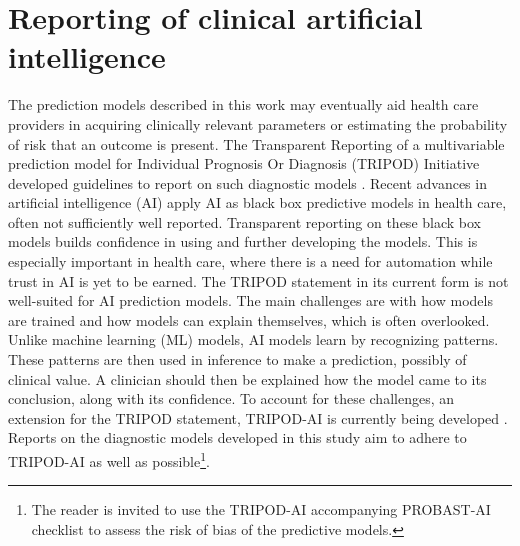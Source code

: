 \section{Reporting of clinical artificial intelligence}
The prediction models described in this work may eventually aid health care providers in acquiring clinically relevant parameters or estimating the probability of risk that an outcome is present.
The Transparent Reporting of a multivariable prediction model for Individual Prognosis Or Diagnosis (TRIPOD) Initiative developed guidelines to report on such diagnostic models \cite{Collins2015, Moons2015, Heus2020}.
Recent advances in artificial intelligence (AI) apply AI as black box predictive models in health care, often not sufficiently well reported.
Transparent reporting on these black box models builds confidence in using and further developing the models.
This is especially important in health care, where there is a need for automation while trust in AI is yet to be earned.
The TRIPOD statement in its current form is not well-suited for AI prediction models.
The main challenges are with how models are trained and how models can explain themselves, which is often overlooked.
Unlike machine learning (ML) models, AI models learn by recognizing patterns.
These patterns are then used in inference to make a prediction, possibly of clinical value.
A clinician should then be explained how the model came to its conclusion, along with its confidence.
To account for these challenges, an extension for the TRIPOD statement, TRIPOD-AI is currently being developed \cite{Collins2021,Collins2020}.
Reports on the diagnostic models developed in this study aim to adhere to TRIPOD-AI as well as possible\footnote{The reader is invited to use the TRIPOD-AI accompanying PROBAST-AI \cite{Wolff2019a, Wolff2019b, Collins2021} checklist to assess the risk of bias of the predictive models.}.
